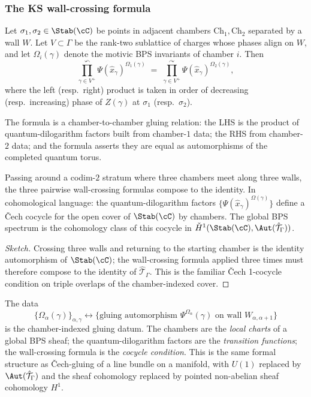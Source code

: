 \subsubsection{The KS wall-crossing formula}

\begin{theorem}
 \label{gl:thm:ks-wall-crossing}
\ClaimStatusProvedElsewhere
 Let $\sigma_1, \sigma_2 \in \Stab(\cC)$ be points in adjacent chambers
 $\mathrm{Ch}_1, \mathrm{Ch}_2$ separated by a wall $W$. Let $V \subset \Gamma$ be the
 rank-two sublattice of charges whose phases align on $W$, and let
 $\Omega_i(\gamma)$ denote the motivic BPS invariants of chamber $i$.
 Then
 \[
 \prod_{\gamma \in V^+}^{\curvearrowleft} \Psi(\hat{x}_\gamma)^{\Omega_1(\gamma)}
 \;=\;
 \prod_{\gamma \in V^+}^{\curvearrowright} \Psi(\hat{x}_\gamma)^{\Omega_2(\gamma)},
 \]
 where the left (resp.\ right) product is taken in order of decreasing
 (resp.\ increasing) phase of $Z(\gamma)$ at $\sigma_1$ (resp.\ $\sigma_2$).
\end{theorem}

The formula is a chamber-to-chamber gluing relation: the LHS is the product
of quantum-dilogarithm factors built from chamber-$1$ data; the RHS from
chamber-$2$ data; and the formula asserts they are equal as automorphisms of
the completed quantum torus.

\begin{corollary}
 \label{cor:ks-cocycle}
 Passing around a codim-$2$ stratum where three chambers meet along three
 walls, the three pairwise wall-crossing formulas compose to the identity.
 In cohomological language: the quantum-dilogarithm factors $\{\Psi(\hat{x}_\gamma)^{\Omega(\gamma)}\}$
 define a \v{C}ech cocycle for the open cover of $\Stab(\cC)$ by chambers.
 The global BPS spectrum is the cohomology class of this cocycle in
 $\check{H}^1(\Stab(\cC), \Aut(\hat{\mathcal{T}}_\Gamma))$.
\end{corollary}

\begin{proof}[Sketch]
 Crossing three walls and returning to the starting chamber is the identity
 automorphism of $\Stab(\cC)$; the wall-crossing formula applied three
 times must therefore compose to the identity of $\hat{\mathcal{T}}_\Gamma$. This is the
 familiar \v{C}ech 1-cocycle condition on triple overlaps of the
 chamber-indexed cover.
\end{proof}

\begin{remark}
 The data
 \[
 \{\Omega_\alpha(\gamma)\}_{\alpha, \gamma} \longleftrightarrow \{\text{gluing automorphism } \Psi^{\Omega_\alpha}(\gamma) \text{ on wall } W_{\alpha, \alpha+1}\}
 \]
 is the chamber-indexed gluing datum. The chambers are the \emph{local
 charts} of a global BPS sheaf; the quantum-dilogarithm factors are the
 \emph{transition functions}; the wall-crossing formula is the
 \emph{cocycle condition}. This is the same formal structure as
 \v{C}ech-gluing of a line bundle on a manifold, with $U(1)$ replaced by
 $\Aut(\hat{\mathcal{T}}_\Gamma)$ and the sheaf cohomology replaced by pointed
 non-abelian sheaf cohomology $H^1$.
\end{remark}

